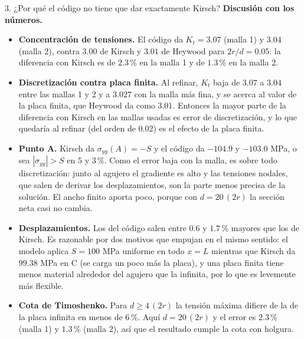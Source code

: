 \begin{desarrollo}{3. ¿Por qu\'e el c\'odigo no tiene que dar exactamente Kirsch?}
\textbf{Discusi\'on con los n\'umeros.}
\begin{itemize}[itemsep=3pt]
  \item \textbf{Concentraci\'on de tensiones.} El c\'odigo da $K_t=3.07$ (malla 1) y
  $3.04$ (malla 2), contra $3.00$ de Kirsch y $3.01$ de Heywood para
  $2r/d=0.05$: la diferencia con Kirsch es de $2.3$\,\% en la malla 1 y de
  $1.3$\,\% en la malla 2.
  \item \textbf{Discretizaci\'on contra placa finita.} Al refinar, $K_t$ baja de
  $3.07$ a $3.04$ entre las mallas 1 y 2 y a $3.027$ con la malla m\'as fina, y
  se acerca al valor de la placa finita, que Heywood da como $3.01$. Entonces la
  mayor parte de la diferencia con Kirsch en las mallas usadas es error de
  discretizaci\'on, y lo que quedar\'ia al refinar (del orden de $0.02$) es el
  efecto de la placa finita.
  \item \textbf{Punto A.} Kirsch da $\sigma_{yy}(A)=-S$ y el c\'odigo da $-104.9$ y
  $-103.0$ MPa, o sea $|\sigma_{yy}|>S$ en $5$ y $3$\,\%. Como el error baja
  con la malla, es sobre todo discretizaci\'on: junto al agujero el gradiente es
  alto y las tensiones nodales, que salen de derivar los desplazamientos, son la
  parte menos precisa de la soluci\'on. El ancho finito aporta poco, porque con
  $d=20\,(2r)$ la secci\'on neta casi no cambia.
  \item \textbf{Desplazamientos.} Los del c\'odigo salen entre $0.6$ y $1.7$\,\%
  mayores que los de Kirsch. Es razonable por dos motivos que empujan en el
  mismo sentido: el modelo aplica $S=100$ MPa uniforme en todo $x=L$ mientras
  que Kirsch da $99.38$ MPa en C (se carga un poco m\'as la placa), y una placa
  finita tiene menos material alrededor del agujero que la infinita, por lo que
  es levemente m\'as flexible.
  \item \textbf{Cota de Timoshenko.} Para $d\ge4\,(2r)$ la tensi\'on m\'axima
  difiere de la de la placa infinita en menos de $6$\,\%. Aqu\'i $d=20\,(2r)$ y
  el error es $2.3$\,\% (malla 1) y $1.3$\,\% (malla 2), as\'i que el resultado
  cumple la cota con holgura.
\end{itemize}
\end{desarrollo}
